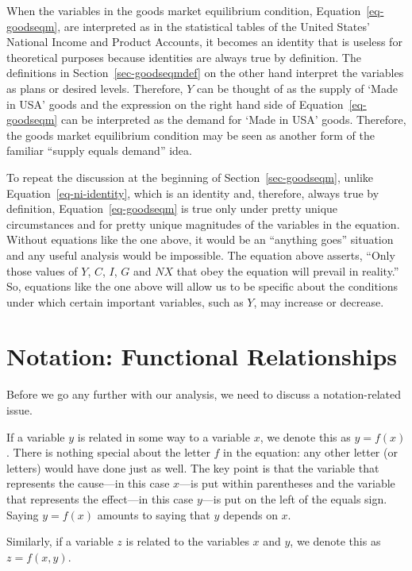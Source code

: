 \documentclass[
  letterpaper,
]{book}
\theoremstyle{plain}
\theoremstyle{remark}
\begin{document}
When the variables in the goods market equilibrium condition,
Equation~\ref{eq-goodseqm}, are interpreted as in the statistical tables
of the United States' National Income and Product Accounts, it becomes
an identity that is useless for theoretical purposes because identities
are always true by definition. The definitions in
Section~\ref{sec-goodseqmdef} on the other hand interpret the variables
as plans or desired levels. Therefore, \(Y\) can be thought of as the
supply of `Made in USA' goods and the expression on the right hand side
of Equation~\ref{eq-goodseqm} can be interpreted as the demand for `Made
in USA' goods. Therefore, the goods market equilibrium condition may be
seen as another form of the familiar ``supply equals demand'' idea.

To repeat the discussion at the beginning of Section~\ref{sec-goodseqm},
unlike Equation~\ref{eq-ni-identity}, which is an identity and,
therefore, always true by definition, Equation~\ref{eq-goodseqm} is true
only under pretty unique circumstances and for pretty unique magnitudes
of the variables in the equation. Without equations like the one above,
it would be an ``anything goes'' situation and any useful analysis would
be impossible. The equation above asserts, ``Only those values of \(Y\),
\(C\), \(I\), \(G\) and \(NX\) that obey the equation will prevail in
reality.'' So, equations like the one above will allow us to be specific
about the conditions under which certain important variables, such as
\(Y\), may increase or decrease.

\section{Notation: Functional Relationships}\label{sec-functional}

Before we go any further with our analysis, we need to discuss a
notation-related issue.

If a variable \(y\) is related in some way to a variable \(x\), we
denote this as \(y=f(x)\). There is nothing special about the letter
\(f\) in the equation: any other letter (or letters) would have done
just as well. The key point is that the variable that represents the
cause---in this case \(x\)---is put within parentheses and the variable
that represents the effect---in this case \(y\)---is put on the left of
the equals sign. Saying \(y=f(x)\) amounts to saying that \(y\) depends
on \(x\).

Similarly, if a variable \(z\) is related to the variables \(x\) and
\(y\), we denote this as \(z=f(x,y)\).
\end{document}
